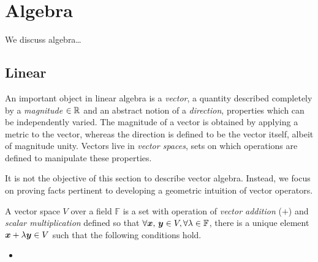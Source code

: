 \chapter{Algebra}
We discuss algebra\ldots

\section{Linear}
An important object in linear algebra is a \textit{vector}, a quantity described completely by a \textit{magnitude} $\in\mathbb{R}$ and an abstract notion of a \textit{direction}, properties which can be independently varied. The magnitude of a vector is obtained by applying a metric to the vector, whereas the direction is defined to be the vector itself, albeit of magnitude unity. Vectors live in \textit{vector spaces}, sets on which operations are defined to manipulate these properties.

It is not the objective of this section to describe vector algebra. Instead, we focus on proving facts pertinent to developing a geometric intuition of vector operators.

\begin{definition} A vector space $V$ over a field $\mathbb{F}$ is a set with operation of \textit{vector addition} ($+$) and \textit{scalar multiplication} defined so that $\forall \boldsymbol{x},\,\boldsymbol{y}\in V,\forall \lambda\in\mathbb{F}$, there is a unique element $\boldsymbol{x} + \lambda\boldsymbol{y} \in V$ such that the following conditions hold.
\begin{itemize}[Axioms of vector spaces]
    \item {}
\end{itemize}
\end{definition}

